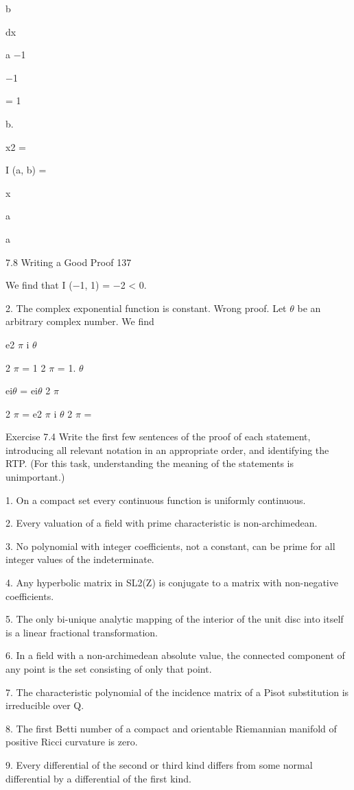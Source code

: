 \documentclass[11pt]{article}
\theoremstyle{plain}
\theoremstyle{definition}
\begin{document}
b

dx

a $-$1

$-$1

= 1

b.

x2 =

I (a, b) =

x

a

a

7.8 Writing a Good Proof 137

We find that I ($-$1, 1) = $-$2 < 0. 

2. The complex exponential function is constant. Wrong proof. Let $\theta$ be an arbitrary complex number. We find

e2 $\pi$ i $\theta$

2 $\pi$ = 1 2 $\pi$ = 1. $\theta$ 

ei$\theta$ = ei$\theta$ 2 $\pi$

2 $\pi$ = e2 $\pi$ i $\theta$ 2 $\pi$ =

Exercise 7.4 Write the first few sentences of the proof of each statement, introducing all relevant notation in an appropriate order, and identifying the RTP. (For this task, understanding the meaning of the statements is unimportant.)

1. On a compact set every continuous function is uniformly continuous.

2. Every valuation of a field with prime characteristic is non-archimedean.

3. No polynomial with integer coefficients, not a constant, can be prime for all integer values of the indeterminate.

4. Any hyperbolic matrix in SL2(Z) is conjugate to a matrix with non-negative coefficients.

5. The only bi-unique analytic mapping of the interior of the unit disc into itself is a linear fractional transformation.

6. In a field with a non-archimedean absolute value, the connected component of any point is the set consisting of only that point.

7. The characteristic polynomial of the incidence matrix of a Pisot substitution is irreducible over Q.

8. The first Betti number of a compact and orientable Riemannian manifold of positive Ricci curvature is zero.

9. Every differential of the second or third kind differs from some normal differential by a differential of the first kind.
\end{document}
